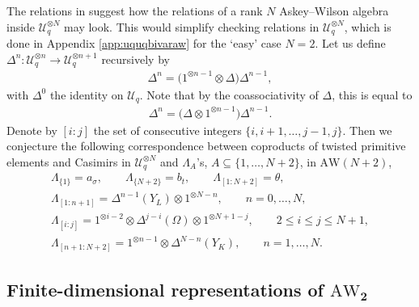 \documentclass[10pt,a4paper]{amsart}
\numberwithin{equation}{section}
\newcommand{\AW}[1]{\mathrm{AW}_{#1}}
\newcommand{\tensor}[1]{^{\otimes{#1}}}
\newcommand{\Uq}{\mathcal{U}_q}
\begin{document}
\begin{Remark}
	The relations in \cite{DeBie2020} suggest how the relations of a rank $N$ Askey--Wilson algebra inside $\Uq^{\otimes N}$ may look. This would simplify checking relations in $\Uq\tensor{N}$, which is done in Appendix \ref{app:uquqbivaraw} for the `easy' case $N=2$. Let us define $\Delta^n\colon \Uq\tensor{n}\to\Uq\tensor{n+1}$ recursively by
	\begin{gather*}
		\Delta^n=\big(1\tensor{n-1}\otimes\Delta\big)\Delta^{n-1},
	\end{gather*}
	with $\Delta^0$ the identity on $\Uq$. Note that by the coassociativity of $\Delta$, this is equal to
	\begin{gather*}
		\Delta^n=\big(\Delta\otimes 1\tensor{n-1}\big)\Delta^{n-1}.
	\end{gather*}
	Denote by $[i:j]$ the set of consecutive integers $\{i,i+1,\dots,j-1,j\}$. Then we conjecture the following correspondence between coproducts of twisted primitive elements and Casimirs in $\Uq\tensor{N}$ and $\Lambda_A$'s, $A\subseteq \{1,\dots,N+2\}$, in $\mathrm{AW}(N+2)$,
	\begin{gather*}
		\Lambda_{\{1\}}=a_\sigma,\qquad \Lambda_{\{N+2\}}=b_t,\qquad \Lambda_{[1:N+2]}=\theta,\\
		\Lambda_{[1:n+1]}=\Delta^{n-1}(Y_L)\otimes 1\tensor{N-n},\qquad n=0,\dots,N,\\
		\Lambda_{[i:j]}=1\tensor{i-2}\otimes \Delta^{j-i}(\Omega)\otimes 1\tensor{N+1-j},\qquad 2\leq i \leq j\leq N+1,\\
		\Lambda_{[n+1:N+2]}=1\tensor{n-1}\otimes \Delta^{N-n}(Y_K),\qquad n=1,\dots,N.
	\end{gather*}
\end{Remark}

\subsection[Finite-dimensional representations of AW\_2]{Finite-dimensional representations of $\boldsymbol{\AW{2}}$}
\end{document}
